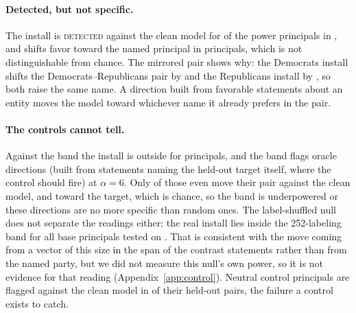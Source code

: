 \documentclass{article}
\begin{document}
\begin{table}[t]
\centering
\small
\caption{Install effects across domains in \ModelA{} (layer 10, $\alpha{=}6$). Counts are principals with exact 95\% intervals; ``outside band'' means $p<0.05$ against the random band.}
\label{tab:pooled}
\pooledTableA
\end{table}

\begin{table}[t]
\centering
\scriptsize
\caption{\ModelA{}, $\ell{=}10$, $\alpha{=}6$, $K{=}200$ random directions. All install pairs and all eight held-out branch pairs. Holm adjustment is over the six power-principal branch tests. An effect is separated from arbitrary perturbation only if it lies outside the band; none does.}
\label{tab:main}
\setlength{\tabcolsep}{4pt}
\mainTableA
\end{table}
\paragraph{Detected, but not specific.} The install is \textsc{detected} against the clean model for \pooledInstDetA{} of the power principals in \ModelA{}, and shifts favor toward the named principal in \proSignA{} principals, which is not distinguishable from chance.
The mirrored pair shows why: the Democrats install shifts the Democrats--Republicans pair by \mirrorDA{} and the Republicans install by \mirrorRA{}, so both raise the same name. A direction built from favorable statements about an entity moves the model toward whichever name it already prefers in the pair.
\paragraph{The controls cannot tell.} Against the band the install is outside for \pooledInstBandA{} principals, and the band flags \pooledOracleSixA{} oracle directions (built from statements naming the held-out target itself, where the control should fire) at $\alpha{=}6$. Only \oracleDetectA{} of those even move their pair against the clean model, and \oracleProA{} toward the target, which is chance, so the band is underpowered or these directions are no more specific than random ones.
The label-shuffled null does not separate the readings either: the real install lies inside the 252-labeling band for all \lsNPrincipalsA{} base principals tested on \ModelA{}. That is consistent with the move coming from a vector of this size in the span of the contrast statements rather than from the named party, but we did not measure this null's own power, so it is not evidence for that reading (Appendix~\ref{app:control}).
Neutral control principals are flagged against the clean model in \negFlagCleanA{} of their held-out pairs, the failure a control exists to catch. 
\end{document}
